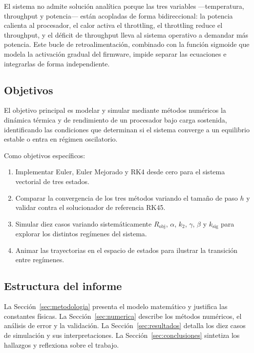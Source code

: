 \documentclass[10pt, twocolumn]{article}
\begin{document}
El sistema no admite solución analítica porque las tres variables —temperatura, throughput y potencia— están acopladas de forma bidireccional: la potencia calienta al procesador, el calor activa el throttling, el throttling reduce el throughput, y el déficit de throughput lleva al sistema operativo a demandar más potencia. Este bucle de retroalimentación, combinado con la función sigmoide que modela la activación gradual del firmware, impide separar las ecuaciones e integrarlas de forma independiente.

\subsection{Objetivos}

El objetivo principal es modelar y simular mediante métodos numéricos la dinámica térmica y de rendimiento de un procesador bajo carga sostenida, identificando las condiciones que determinan si el sistema converge a un equilibrio estable o entra en régimen oscilatorio.

Como objetivos específicos:
\begin{enumerate}\setlength\itemsep{0pt}
  \item Implementar Euler, Euler Mejorado y RK4 desde cero para el sistema vectorial de tres estados.
  \item Comparar la convergencia de los tres métodos variando el tamaño de paso $h$ y validar contra el solucionador de referencia RK45.
  \item Simular diez casos variando sistemáticamente $R_\text{obj}$, $\alpha$, $k_2$, $\gamma$, $\beta$ y $k_\text{sig}$ para explorar los distintos regímenes del sistema.
  \item Animar las trayectorias en el espacio de estados para ilustrar la transición entre regímenes.
\end{enumerate}

\subsection{Estructura del informe}

La Sección~\ref{sec:metodologia} presenta el modelo matemático y justifica las constantes físicas. La Sección~\ref{sec:numerica} describe los métodos numéricos, el análisis de error y la validación. La Sección~\ref{sec:resultados} detalla los diez casos de simulación y sus interpretaciones. La Sección~\ref{sec:conclusiones} sintetiza los hallazgos y reflexiona sobre el trabajo.
\end{document}
